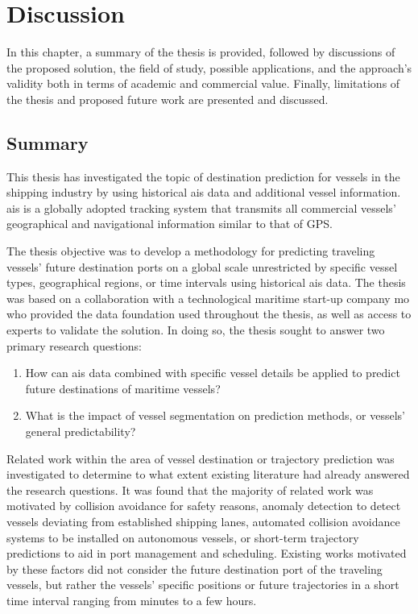 \chapter{Discussion}
\label{chap:discussion}

In this chapter, a summary of the thesis is provided, followed by discussions of the proposed solution, the field of study, possible applications, and the approach's validity both in terms of academic and commercial value. Finally, limitations of the thesis and proposed future work are presented and discussed.

\section{Summary}
\label{sec:summary}

This thesis has investigated the topic of destination prediction for vessels in the shipping industry by using historical \acrfull{ais} data and additional vessel information. \acrshort{ais} is a globally adopted tracking system that transmits all commercial vessels' geographical and navigational information similar to that of GPS\@.

The thesis objective was to develop a methodology for predicting traveling vessels' future destination ports on a global scale unrestricted by specific vessel types, geographical regions, or time intervals using historical \acrshort{ais} data. The thesis was based on a collaboration with a technological maritime start-up company \acrfull{mo} who provided the data foundation used throughout the thesis, as well as access to experts to validate the solution. In doing so, the thesis sought to answer two primary research questions:

\begin{enumerate}
    \item How can \acrshort{ais} data combined with specific vessel details be applied to predict future destinations of maritime vessels?
    \item What is the impact of vessel segmentation on prediction methods, or vessels' general predictability?
\end{enumerate}

Related work within the area of vessel destination or trajectory prediction was investigated to determine to what extent existing literature had already answered the research questions. It was found that the majority of related work was motivated by collision avoidance for safety reasons, anomaly detection to detect vessels deviating from established shipping lanes, automated collision avoidance systems to be installed on autonomous vessels, or short-term trajectory predictions to aid in port management and scheduling. Existing works motivated by these factors did not consider the future destination port of the traveling vessels, but rather the vessels' specific positions or future trajectories in a short time interval ranging from minutes to a few hours.


